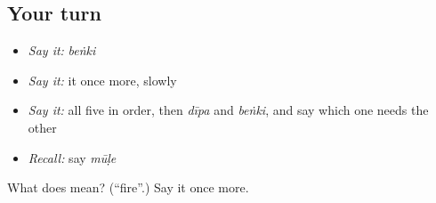 \subsection*{Your turn}
\begin{itemize}
\raggedright
  \item \emph{Say it:} \emph{beṅki}
  \item \emph{Say it:} it once more, slowly
  \item \emph{Say it:} all five in order, then \emph{dīpa} and \emph{beṅki}, and say which one needs the other
  \item \emph{Recall:} say \emph{mūḷe}
\end{itemize}

\begin{tcolorbox}[breakable,colback=teal!4,colframe=teal!35!black,title={Before you move on}]
What does  mean? (\textquotedblleft{}fire\textquotedblright{}.) Say it once more.
\end{tcolorbox}
